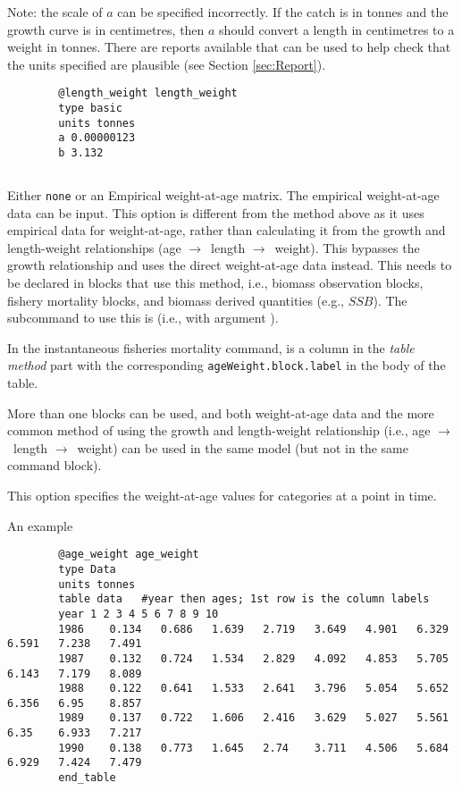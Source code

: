 Note: the scale of $a$ can be specified incorrectly. If the catch is in tonnes and the growth curve is in centimetres, then $a$ should convert a length in centimetres to a weight in tonnes. There are reports available that can be used to help check that the units specified are plausible (see Section \ref{sec:Report}).
{\small{\begin{verbatim}
		@length_weight length_weight
		type basic
		units tonnes
		a 0.00000123
		b 3.132
\end{verbatim}}}

\ifAgeBased
\subsection{}\label{sec:AgeWeight} 

Either \texttt{none}\label{sec:AgeWeight-None} or an Empirical weight-at-age matrix. The empirical weight-at-age data can be input\label{sec:AgeWeight-Data}. This option is different from the method above as it uses empirical data for weight-at-age, rather than calculating it from the growth and length-weight relationships (age $\rightarrow$\ length $\rightarrow$\ weight). This bypasses the growth relationship and uses the direct weight-at-age data instead. This needs to be declared in blocks that use this method, i.e., biomass observation blocks, fishery mortality blocks, and biomass derived quantities (e.g., $SSB$). The subcommand to use this is  (i.e., with argument  ). 

In the instantaneous fisheries mortality command,  is a column in the \textit{table method} part with the corresponding \texttt{ageWeight.block.label} in the body of the table. 

More than one  blocks can be used, and both weight-at-age data and the more common method of using the growth and length-weight relationship (i.e., age $\rightarrow$\ length $\rightarrow$\ weight) can be used in the same model (but not in the same command block).

This option specifies the weight-at-age values for categories at a point in time.

An example

{\small{\begin{verbatim}
		@age_weight age_weight
		type Data
		units tonnes
		table data   #year then ages; 1st row is the column labels
		year 1 2 3 4 5 6 7 8 9 10
		1986	0.134	0.686	1.639	2.719	3.649	4.901	6.329	6.591	7.238	7.491
		1987	0.132	0.724	1.534	2.829	4.092	4.853	5.705	6.143	7.179	8.089
		1988	0.122	0.641	1.533	2.641	3.796	5.054	5.652	6.356	6.95	8.857
		1989	0.137	0.722	1.606	2.416	3.629	5.027	5.561	6.35	6.933	7.217
		1990	0.138	0.773	1.645	2.74	3.711	4.506	5.684	6.929	7.424	7.479
		end_table
\end{verbatim}}}


